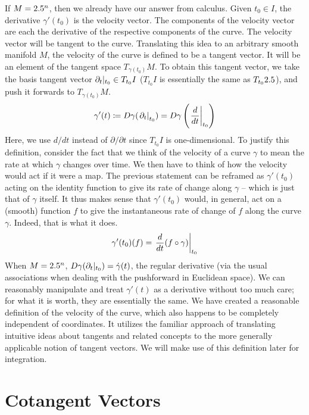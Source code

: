 \documentclass[a4paper,12pt]{article}
\begin{document}
If $M = 2.5^n$, then we already have our answer from calculus.
Given $t_0 \in I$, the derivative $\gamma'(t_0)$ is the velocity vector.
The components of the velocity vector are each the derivative of the respective components of the curve.
The velocity vector will be tangent to the curve.
Translating this idea to an arbitrary smooth manifold $M$, the velocity of the curve is defined to be a tangent vector.
It will be an element of the tangent space $T_{\gamma(t_0)} M$.
To obtain this tangent vector, we take the basis tangent vector $\eval*{\partial_t}{t_0} \in T_{t_0} I$ ($T_{t_0} I$ is essentially the same as $T_{t_0} 2.5$), and push it forwards to $T_{\gamma(t_0)} M$.
\begin{equation*}
    \gamma'(t) \coloneq D\gamma(\eval{\partial_t}{t_0}) = D\gamma\left(\eval{\frac{d}{dt}}{t_0}\right)
\end{equation*}
Here, we use $d/dt$ instead of $\partial/\partial t$ since $T_{t_0} I$ is one-dimensional.
To justify this definition, consider the fact that we think of the velocity of a curve $\gamma$ to mean the rate at which $\gamma$ changes over time.
We then have to think of how the velocity would act if it were a map.
The previous statement can be reframed as $\gamma'(t_0)$ acting on the identity function to give its rate of change along $\gamma$ -- which is just that of $\gamma$ itself.
It thus makes sense that $\gamma'(t_0)$ would, in general, act on a (smooth) function $f$ to give the instantaneous rate of change of $f$ along the curve $\gamma$.
Indeed, that is what it does.
\begin{equation*}
    \gamma'(t_0)(f) = \eval{\frac{d}{dt}(f \circ \gamma)}{t_0}
\end{equation*}
When $M = 2.5^n$, $D\gamma(\eval*{\partial_t}{t_0}) = \dot{\gamma}(t)$, the regular derivative (via the usual associations when dealing with the pushforward in Euclidean space).
We can reasonably manipulate and treat $\gamma'(t)$ as a derivative without too much care; for what it is worth, they are essentially the same.
We have created a reasonable definition of the velocity of the curve, which also happens to be completely independent of coordinates.
It utilizes the familiar approach of translating intuitive ideas about tangents and related concepts to the more generally applicable notion of tangent vectors.
We will make use of this definition later for integration.

\section{Cotangent Vectors}
\end{document}
